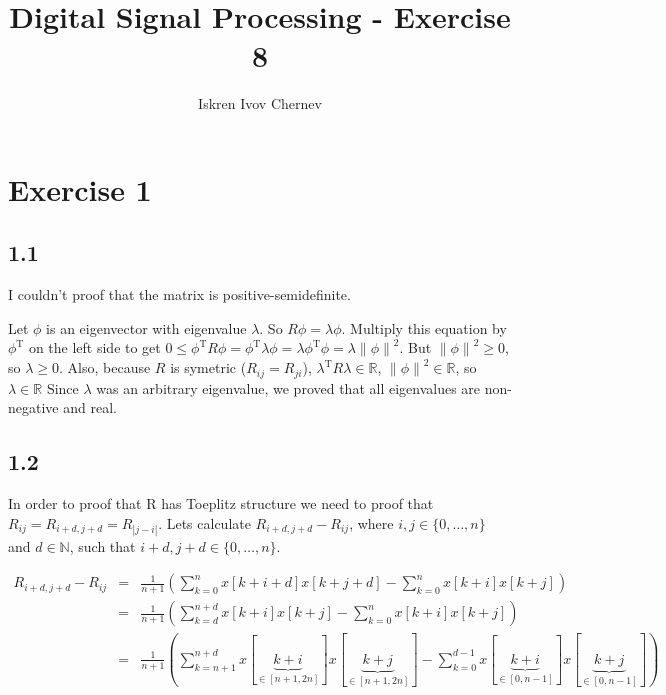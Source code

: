 \documentclass[a4paper]{article}
\def\T{\mathrm{T}}
\def\R{\mathbb{R}}
\def\N{\mathbb{N}}
\newcommand{\norm}[1] {\left\lVert #1 \right\rVert}
\newcommand{\B}[1] {\left(#1\right)}
\begin{document}
\title{Digital Signal Processing - Exercise 8}
\author{Iskren Ivov Chernev}
\maketitle

\section*{Exercise 1}

\subsection*{1.1}

I couldn't proof that the matrix is positive-semidefinite.

Let $ \phi $ is an eigenvector with eigenvalue $ \lambda $. So $ R\phi
= \lambda\phi $. Multiply this equation by $ \phi^\T $ on the left side to get
$ 0 \le \phi^\T R \phi = \phi^\T \lambda \phi = \lambda \phi^\T \phi = \lambda
\norm{\phi}^2 $. But $ \norm{\phi}^2 \ge 0 $, so $ \lambda \ge 0 $. Also,
because $ R $ is symetric ($ R_{ij} = R_{ji} $), $ \lambda^\T R\lambda \in \R
$, $ \norm{\phi}^2 \in \R $, so $ \lambda \in \R $ Since $ \lambda $ was an
arbitrary eigenvalue, we proved that all eigenvalues are non-negative and real.

\subsection*{1.2}

In order to proof that R has Toeplitz structure we need to proof that $ R_{ij}
= R_{i+d,j+d} = R_{|j-i|} $. Lets calculate $ R_{i+d,j+d} - R_{ij} $, where
$ i,j \in \{ 0, \dots, n \} $ and $ d \in \N $, such that $ i + d, j + d \in \{
0, \dots, n \} $.

\begin{eqnarray*}
R_{i+d,j+d} - R_{ij}
  &=& \frac{1}{n+1}\B{ \sum_{k=0}^{n} x[k+i+d]x[k+j+d] - \sum_{k=0}^{n} x[k+i]x[k+j] } \\
  &=& \frac{1}{n+1}\B{ \sum_{k=d}^{n+d} x[k+i]x[k+j] - \sum_{k=0}^{n} x[k+i]x[k+j] } \\
  &=& \frac{1}{n+1}\B{ \sum_{k=n+1}^{n+d} x[\underbrace{k+i}_{\in [n+1,2n]}]x[\underbrace{k+j}_{\in [n+1,2n]}]
                     - \sum_{k=0}^{d-1} x[\underbrace{k+i}_{\in [0,n-1]}]x[\underbrace{k+j}_{\in [0,n-1]}] } \\
\end{eqnarray*}
\end{document}
